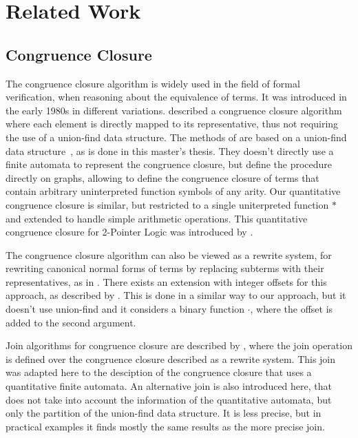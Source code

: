 \chapter{Related Work}\label{chapter:related-work}


\section{Congruence Closure}

The congruence closure algorithm is widely used in the field of formal verification,
when reasoning about the equivalence of terms. It was introduced in the early 1980s
in different variations. \textcite{cc-tarjan} described a congruence closure algorithm
where each element is directly mapped to its representative, thus not requiring the
use of a union-find data structure.
The methods of \textcite{cc-nelson,cc-shostak} are based on a union-find data structure~\cite{uf-tarjan}, as
is done in this master's thesis. They doesn't directly use a finite automata to represent
the congruence closure, but define the procedure directly on graphs,
allowing to define the congruence closure of terms that contain arbitrary uninterpreted function symbols
of any arity.
Our quantitative congruence closure is similar, but restricted to a single uniterpreted function $*$
and extended to handle simple arithmetic operations.
This quantitative congruence closure for 2-Pointer Logic was introduced by \textcite{2pointer}.

The congruence closure algorithm can also be viewed as a rewrite system,
for rewriting canonical normal forms of terms by replacing subterms with their representatives,
as in \cite{cc-kapur,abstract-cc}.
There exists an extension with integer offsets for this approach, as described by \textcite{cc-offsets}.
This is done in a similar way to our approach, but it doesn't use union-find and it considers a
binary function $\cdot$, where the offset is added to the second argument.

Join algorithms for congruence closure are described by \textcite{join},
where the join operation is defined over the congruence closure described
as a rewrite system.
This join was adapted here to the desciption of the congruence closure that uses a quantitative finite automata.
An alternative join is also introduced here, that does not take into account the information of the
quantitative automata, but only the partition of the union-find data structure.
It is less precise, but in practical examples it finds mostly the same results as the more precise join.


